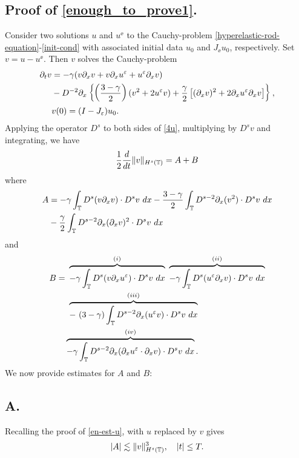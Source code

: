 \subsection{Proof of \eqref{enough_to_prove1}.}
Consider two solutions $u $ and $u^\ee$ to the Cauchy-problem
\eqref{hyperelastic-rod-equation}-\eqref{init-cond}
with associated initial data $u_0$ and
$J_\ee u_0$, respectively. Set $v= u -u^\ee $. Then $v$ solves the
Cauchy-problem
\begin{align}
\label{4u}
\partial_t v 
& =  - \gamma (v \partial_x v + v \partial_x u^\varepsilon + u^\varepsilon \partial_x v)  
\\
& - D^{-2} \partial_x \left\{ \left (\frac{3-\gamma}{2} \right )(v^2 +
2u^\varepsilon v) + \frac{\gamma}{2}\left[ (\partial_x v)^2 + 2 \partial_x u^\varepsilon \partial_x v \right]
\right\}, \notag
\\
& v(0) = (I- J_\varepsilon)u_0.
\label{5u}
\end{align}
Applying the operator $D^s$ to both sides of \eqref{4u}, multiplying by
$D^s v$ and integrating, we have
\begin{equation}
\begin{split}
\frac{1}{2}\frac{d}{dt} \|v\|_{H^s(\mathbb{T})} = A + B
\label{6u}
\end{split}
\end{equation}
where
\begin{equation}
\begin{split}
A
& =  -\gamma \int_{\mathbb{T}} D^s(v \partial_x v) \cdot D^s v \
dx
- \frac{3- \gamma}{2} \int_{\mathbb{T}} D^{s-2} \partial_x (v^2) \cdot D^s v
\ dx
\\
& - \frac{\gamma}{2}\int_{\mathbb{T}} D^{s-2} \partial_x (\partial_x v)^2 \cdot D^s
v \ dx
\label{7u}
\end{split}
\end{equation}
and
\begin{equation}
\begin{split}
B 
= & \ \overbrace{-\gamma \int_{\mathbb{T}} D^s (v \partial_x u^\varepsilon ) \cdot D^s v \
dx}^{(i)} \ \overbrace{-\gamma \int_{\mathbb{T}} D^s (u^\varepsilon \partial_x v) \cdot D^s v \
dx}^{(ii)}
\\
& \ \overbrace{- \ ( 3- \gamma) \int_{\mathbb{T}} D^{s-2} \partial_x (u^\varepsilon v) \cdot D^s
v \ dx}^{(iii)}
\\
& \overbrace{-\gamma \int_{\mathbb{T}} D^{s-2} \partial_x
(\partial_x u^\varepsilon \cdot \partial_x v) \cdot D^s v \
dx}^{(iv)}.
\label{8u}
\end{split}
\end{equation}
We now provide estimates for $A$ and $B$:
\subsection{A.} 
Recalling the proof of \eqref{en-est-u}, with $u$ replaced by
$v$ gives 
\begin{equation}
\begin{split}
|A| \lesssim \|v\|_{H^s(\mathbb{T})}^3, \quad |t| \le T.
\label{8'u}
\end{split}
\end{equation}
%
